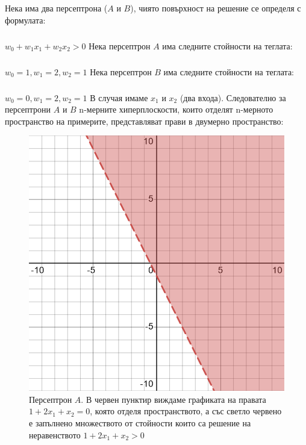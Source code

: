 \documentclass[12pt]{article}
\begin{document}
	Нека има два персептрона ($A$ и $B$), чиято повърхност на решение се
	определя с формулата:
	\subparagraph{}
	$w_{0} + w_{1}x_{1} + w_{2}x_{2} > 0$
	\newline\newline\newline
	Нека персептрон $A$ има следните стойности на теглата:
	\subparagraph{}
	$w_{0} = 1, w_{1} = 2, w_{2} = 1$
	\newline\newline
	Нека персептрон $B$ има следните стойности на теглата:
	\subparagraph{}
	$w_{0} = 0, w_{1} = 2, w_{2} = 1$
	\newline\newline\newline
	В случая имаме $x_{1}$ и $x_{2}$ (два входа). Следователно за персептрони $A$ и $B$ n-мерните хиперплоскости, които отделят n-мерното пространство на примерите, представляват прави в двумерно пространство:\newpage
	\begin{figure}[H]
		\centering
		\includegraphics[width=140mm]{desmos-graph.png} 
		\caption{Персептрон $A$. В червен пунктир виждаме графиката на правата $1 + 2x_{1} + x_{2} = 0$, която отделя пространството, а със светло червено е запълнено множеството от стойности които са решение на неравенството $1 + 2x_{1} + x_{2} > 0$}
	\end{figure}
\end{document}
